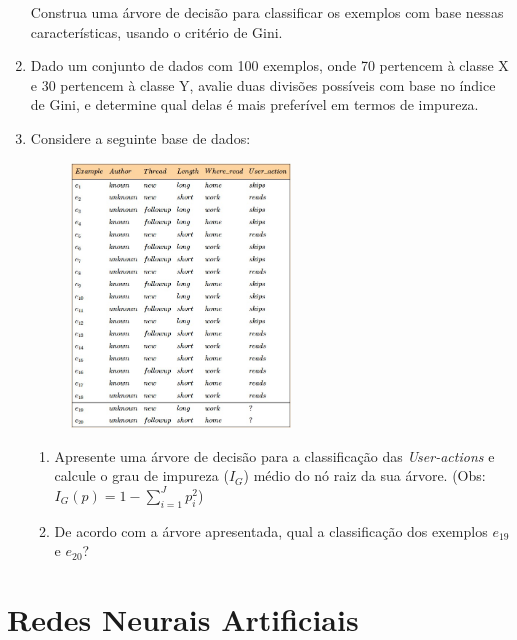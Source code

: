 \documentclass{article}
\begin{document}
\begin{enumerate}
   Construa uma árvore de decisão para classificar os exemplos com base nessas características, usando o critério de Gini.

   \item Dado um conjunto de dados com 100 exemplos, onde 70 pertencem à classe X e 30 pertencem à classe Y, avalie duas divisões possíveis com base no índice de Gini, e determine qual delas é mais preferível em termos de impureza.

   \item Considere a seguinte base de dados:
    
   \begin{figure}[!ht]
        \centering
        \includegraphics[width=0.55\textwidth]{abc.jpg}
   \end{figure}


       \begin{enumerate}
       
       \item Apresente uma árvore de decisão para a classificação das \textit{User-actions} e calcule o grau de impureza ($I_G$) médio do nó raiz da sua árvore. (Obs: $I_G(p) = 1 - \sum_{i=1}^{J}p_i^2$)
           
       \item De acordo com a árvore apresentada, qual a classificação dos exemplos $e_{19}$ e $e_{20}$?  
       
       \end{enumerate}

    \end{enumerate}
    
    \section{Redes Neurais Artificiais}
\end{document}
